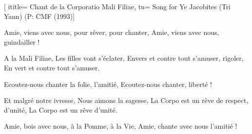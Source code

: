  [
ititle= {Chant de la Corporatio Mali Filiae},
tu= {Song for Ye Jacobites (Tri Yann) (P: CMF (1993)}]

\beginverse
Amie, viens avec nous, pour rêver, pour chanter,
Amie, viens avec nous, guindailler !
\endverse

\beginverse
A la Mali Filiae,
Les filles vont s’éclater,
Envers et contre tout s’amuser, rigoler,
En vert et contre tout s’amuser.
\endverse

\beginverse
Ecoutez-nous chanter la folie, l’amitié,
Ecoutez-nous chanter, liberté !
\endverse

\beginverse
Et malgré notre ivresse,
Nous aimons la sagesse,
La Corpo est un rêve de respect, d’unité,
La Corpo est un rêve d’unité.
\endverse

\beginverse
Amie, bois avec nous, à la Pomme, à la Vie,
Amie, chante avec nous l’amitié !
\endverse

\endsong
